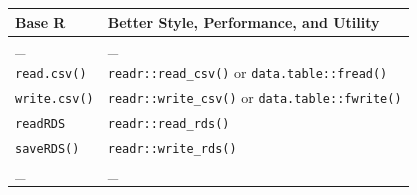 \documentclass[]{book}
\begin{document}
\begin{longtable}[]{@{}ll@{}}
\toprule
\begin{minipage}[b]{0.47\columnwidth}\raggedright
Base R\strut
\end{minipage} & \begin{minipage}[b]{0.47\columnwidth}\raggedright
Better Style, Performance, and Utility\strut
\end{minipage}\tabularnewline
\midrule
\endhead
\begin{minipage}[t]{0.47\columnwidth}\raggedright
\_\strut
\end{minipage} & \begin{minipage}[t]{0.47\columnwidth}\raggedright
\_\strut
\end{minipage}\tabularnewline
\begin{minipage}[t]{0.47\columnwidth}\raggedright
\texttt{read.csv()}\strut
\end{minipage} & \begin{minipage}[t]{0.47\columnwidth}\raggedright
\texttt{readr::read\_csv()} or \texttt{data.table::fread()}\strut
\end{minipage}\tabularnewline
\begin{minipage}[t]{0.47\columnwidth}\raggedright
\texttt{write.csv()}\strut
\end{minipage} & \begin{minipage}[t]{0.47\columnwidth}\raggedright
\texttt{readr::write\_csv()} or \texttt{data.table::fwrite()}\strut
\end{minipage}\tabularnewline
\begin{minipage}[t]{0.47\columnwidth}\raggedright
\texttt{readRDS}\strut
\end{minipage} & \begin{minipage}[t]{0.47\columnwidth}\raggedright
\texttt{readr::read\_rds()}\strut
\end{minipage}\tabularnewline
\begin{minipage}[t]{0.47\columnwidth}\raggedright
\texttt{saveRDS()}\strut
\end{minipage} & \begin{minipage}[t]{0.47\columnwidth}\raggedright
\texttt{readr::write\_rds()}\strut
\end{minipage}\tabularnewline
\begin{minipage}[t]{0.47\columnwidth}\raggedright
\_\strut
\end{minipage} & \begin{minipage}[t]{0.47\columnwidth}\raggedright
\_\strut
\end{minipage}\tabularnewline

\end{longtable}
\end{document}
